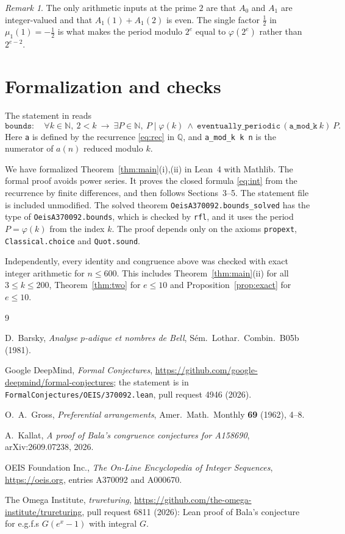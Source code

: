 \documentclass[11pt]{amsart}
\theoremstyle{remark}
\newtheorem{remark}[theorem]{Remark}
\newcommand{\Q}{\mathbb{Q}}
\newcommand{\lean}[1]{\texttt{#1}}
\begin{document}
\begin{remark}
The only arithmetic inputs at the prime $2$ are that $A_0$ and $A_1$ are integer-valued and that $A_1(1)+A_1(2)$ is even.
The single factor $\frac12$ in $\mu_1(1)=-\frac12$ is what makes the period modulo $2^e$ equal to $\varphi(2^e)$ rather than $2^{e-2}$.
\end{remark}

\section{Formalization and checks}

The statement in \cite{FC} reads
\[
\lean{bounds}:\quad \forall k\in\mathbb N,\ 2<k\ \to\ \exists P\in\mathbb N,\ P\mid\varphi(k)\ \wedge\ \lean{eventually\_periodic}\,(\lean{a\_mod\_k}\ k)\ P .
\]
Here \lean{a} is defined by the recurrence \eqref{eq:rec} in $\Q$, and \lean{a\_mod\_k k n} is the numerator of $a(n)$ reduced modulo $k$.

We have formalized Theorem~\ref{thm:main}(i),(ii) in Lean~4 with Mathlib.
The formal proof avoids power series.
It proves the closed formula \eqref{eq:int} from the recurrence by finite differences, and then follows Sections~3--5.
The statement file is included unmodified.
The solved theorem \lean{OeisA370092.bounds\_solved} has the type of \lean{OeisA370092.bounds}, which is checked by \lean{rfl}, and it uses the period $P=\varphi(k)$ from the index $k$.
The proof depends only on the axioms \lean{propext}, \lean{Classical.choice} and \lean{Quot.sound}.

Independently, every identity and congruence above was checked with exact integer arithmetic for $n\le600$.
This includes Theorem~\ref{thm:main}(ii) for all $3\le k\le200$, Theorem~\ref{thm:two} for $e\le10$ and Proposition~\ref{prop:exact} for $e\le10$.

\begin{thebibliography}{9}

D.~Barsky, \emph{Analyse $p$-adique et nombres de Bell}, S\'em.\ Lothar.\ Combin.\ B05b (1981).

Google DeepMind, \emph{Formal Conjectures}, \url{https://github.com/google-deepmind/formal-conjectures}; the statement is in \texttt{FormalConjectures/OEIS/370092.lean}, pull request 4946 (2026).

O.~A.~Gross, \emph{Preferential arrangements}, Amer.\ Math.\ Monthly \textbf{69} (1962), 4--8.

A.~Kallat, \emph{A proof of Bala's congruence conjectures for A158690}, arXiv:2609.07238, 2026.

OEIS Foundation Inc., \emph{The On-Line Encyclopedia of Integer Sequences}, \url{https://oeis.org}, entries A370092 and A000670.

The Omega Institute, \emph{trureturing}, \url{https://github.com/the-omega-institute/trureturing}, pull request 6811 (2026): Lean proof of Bala's conjecture for e.g.f.s $G(e^x-1)$ with integral $G$.

\end{thebibliography}
\end{document}
